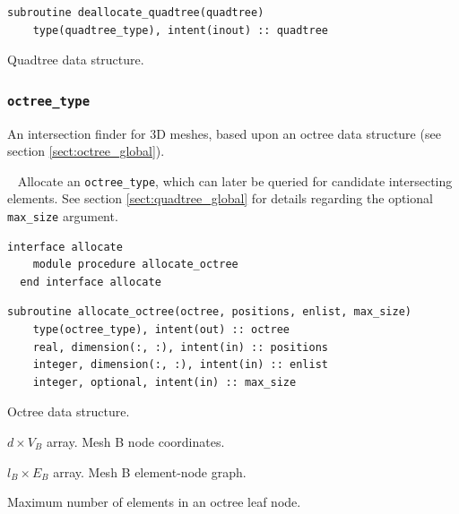 \documentclass{article}
\begin{document}
\begin{lstlisting}[language=FORTRAN]
  subroutine deallocate_quadtree(quadtree)
    type(quadtree_type), intent(inout) :: quadtree
\end{lstlisting}

\begin{description}[font=\ttfamily\bfseries,leftmargin=2.2\parindent,labelindent=1.7\parindent,noitemsep]
  \item[quadtree] Quadtree data structure.
\end{description}

\subsubsection{\texttt{octree\_type}}\label{sect:octree_query}
  
An intersection finder for 3D meshes, based upon an octree data structure (see
section \ref{sect:octree_global}).

~\newline
Allocate an \verb+octree_type+, which can later be queried for candidate
intersecting elements. See section \ref{sect:quadtree_global} for details
regarding the optional \verb+max_size+ argument.

\begin{lstlisting}[language=FORTRAN]
  interface allocate
    module procedure allocate_octree
  end interface allocate
\end{lstlisting}
  
\begin{lstlisting}[language=FORTRAN]
  subroutine allocate_octree(octree, positions, enlist, max_size)
    type(octree_type), intent(out) :: octree
    real, dimension(:, :), intent(in) :: positions
    integer, dimension(:, :), intent(in) :: enlist
    integer, optional, intent(in) :: max_size 
\end{lstlisting}

\begin{description}[font=\ttfamily\bfseries,leftmargin=2.2\parindent,labelindent=1.7\parindent,noitemsep]
  \item[octree] Octree data structure.
  \item[positions] $d \times V_B$ array. Mesh B node coordinates.
  \item[enlist] $l_B \times E_B$ array. Mesh B element-node graph.
  \item[max\_size] Maximum number of elements in an octree leaf node.
\end{description}
\end{document}
